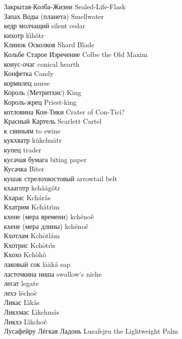 Закрытая-Колба-Жизни \hfill Sealed-Life-Flask\\
Запах Воды (планета) \hfill Smellwater\\
кедр молчащий \hfill silent cedar\\
кихотр \hfill k\^{\i}h\~{o}tr\\
Клинок Осколков \hfill Shard Blade\\
Кольбе Старое Изречение \hfill Colbe the Old Maxim\\
конус-очаг \hfill conical hearth\\
Конфетка \hfill Candy\\
кормилец \hfill nurse\\
Король (Метритхис) \hfill King\\
Король-жрец \hfill Priest-king\\
котловина Кон-Тики \hfill Crater of Con-Tici?\\
Красный Картель \hfill Scarlett Cartel\\
к свиньям \hfill to swine\\
кукхватр \hfill k\`{u}kchu\={a}tr\\
купец \hfill trader\\
кусачая бумага \hfill biting paper\\
Кусачка \hfill Biter\\
кушак стрелохвостовый \hfill arrowtail belt\\
кхааготр \hfill kch\^{a}\={a}g\~{o}tr\\
Кхарас \hfill Kch\'{a}r\v{a}s\\
Кхатрим \hfill Kch\r{a}tr\"{\i}m\\
кхене (мера времени) \hfill kch\"{e}no\^{e}\\
кхене (мера длины) \hfill kch\={e}no\^{e}\\
Кхотлам \hfill Kch\={o}tl\'{a}m\\
Кхотрис \hfill Kch\={o}tr\v{\i}s\\
Кхохо \hfill Kch\`{o}h\^{o}\\
лаковый сок \hfill l\={a}\"{a}k\^{a} sap\\
ласточкина ниша \hfill swallow's niche\\
легат \hfill legate\\
лехэ \hfill l\={e}cho\`{e}\\
Ликас \hfill L\^{\i}k\v{a}s\\
Ликхмас \hfill L\={\i}kchm\r{a}s\\
Ликхэ \hfill L\^{\i}kcho\^{e}\\
Лусафейру Лёгкая Ладонь \hfill Lusafejru the Lightweight Palm\\
